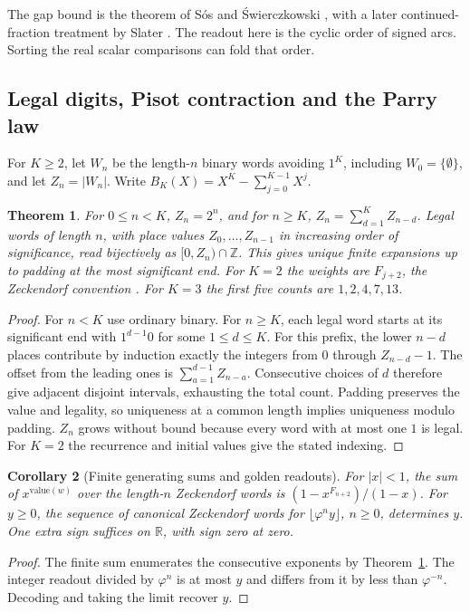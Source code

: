 \documentclass[11pt,reqno]{amsart}
\newtheorem{theorem}{Theorem}[section]
\newtheorem{corollary}[theorem]{Corollary}
\theoremstyle{definition}
\theoremstyle{remark}
\numberwithin{equation}{section}
\newcommand{\R}{\mathbb{R}}
\newcommand{\Z}{\mathbb{Z}}
\begin{document}
The gap bound is the theorem of S\'os and \'Swierczkowski
\cite{m9:Sos,m9:Swierczkowski}, with a later continued-fraction
treatment by Slater \cite{m9:Slater}. The readout here is the cyclic
order of signed arcs. Sorting the real scalar comparisons can fold
that order.

\subsection{Legal digits, Pisot contraction and the Parry law}

For \(K\ge2\), let \(W_n\) be the length-\(n\) binary words avoiding
\(1^K\), including \(W_0=\{\emptyset\}\), and let \(Z_n=|W_n|\).
Write \(B_K(X)=X^K-\sum_{j=0}^{K-1}X^j\).

\begin{theorem}\label{m9:digits}
For \(0\le n<K\), \(Z_n=2^n\), and for \(n\ge K\),
\(Z_n=\sum_{d=1}^K Z_{n-d}\). Legal words of length \(n\), with
place values \(Z_0,\ldots,Z_{n-1}\) in increasing order of significance,
read bijectively as \([0,Z_n)\cap\Z\). This gives unique finite
expansions up to padding at the most significant end. For \(K=2\)
the weights are \(F_{j+2}\), the Zeckendorf convention
\cite{m9:Zeckendorf}. For \(K=3\) the first five counts are
\(1,2,4,7,13\).
\end{theorem}
\begin{proof}
For \(n<K\) use ordinary binary. For \(n\ge K\), each legal word
starts at its significant end with \(1^{d-1}0\) for some
\(1\le d\le K\). For this prefix, the lower \(n-d\) places contribute
by induction exactly the integers from \(0\) through \(Z_{n-d}-1\).
The offset from the leading ones is
\(\sum_{a=1}^{d-1}Z_{n-a}\). Consecutive choices of \(d\) therefore
give adjacent disjoint intervals, exhausting the total count.
Padding preserves the value and legality, so uniqueness at a common
length implies uniqueness modulo padding. \(Z_n\) grows without bound
because every word with at most one \(1\) is legal. For \(K=2\) the
recurrence and initial values give the stated indexing.
\end{proof}

\begin{corollary}[Finite generating sums and golden readouts]\label{m9:thread}
For \(|x|<1\), the sum of \(x^{\mathrm{value}(w)}\) over
the length-\(n\) Zeckendorf words is
\((1-x^{F_{n+2}})/(1-x)\).
For \(y\ge0\), the sequence of canonical Zeckendorf words
for \(\lfloor\varphi^n y\rfloor\), \(n\ge0\), determines \(y\).
One extra sign suffices on \(\R\), with sign zero at zero.
\end{corollary}
\begin{proof}
The finite sum enumerates the consecutive exponents by
Theorem~\ref{m9:digits}. The integer readout divided by
\(\varphi^n\) is at most \(y\) and differs from it by less
than \(\varphi^{-n}\). Decoding and taking the limit recover \(y\).
\end{proof}
\end{document}
